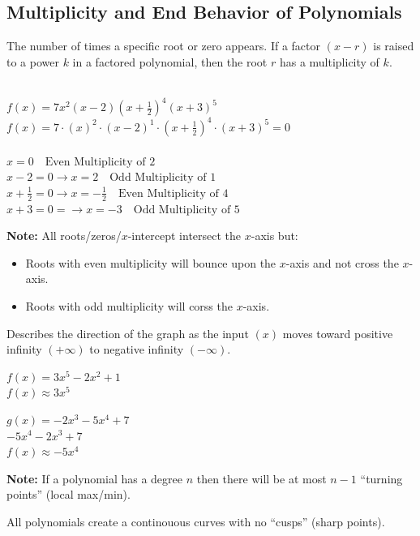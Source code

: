\subsection{Multiplicity and End Behavior of Polynomials}

\begin{definition}[Multiplicity]
  The number of times a specific root or zero appears. If a factor $(x - r)$ is raised to a power $k$ in a factored polynomial, then the root $r$ has a multiplicity of $k$.
\end{definition}

\begin{example}[Multiplicity]
  \hfill \\
  $f(x) = 7x^2 (x - 2) (x + \frac{1}{2})^4 (x + 3)^5$ \\
  $f(x) = 7 \cdot (x)^2 \cdot (x - 2)^1 \cdot (x + \frac{1}{2})^4 \cdot (x + 3)^5 = 0$ \\ \\
  $x = 0 \quad \text{Even Multiplicity of 2}$ \\
  $x - 2 = 0 \to x = 2 \quad \text{Odd Multiplicity of 1}$ \\
  $x + \frac{1}{2} = 0 \to x = -\frac{1}{2} \quad \text{Even Multiplicity of 4}$ \\
  $x + 3 = 0 = \to x = -3 \quad \text{Odd Multiplicity of 5}$
\end{example}

\textbf{Note: }All roots/zeros/$x$-intercept intersect the $x$-axis but:
\begin{itemize}
\item Roots with even multiplicity will bounce upon the $x$-axis and not cross the $x$-axis.
\item Roots with odd multiplicity will corss the $x$-axis.
\end{itemize}

\begin{definition}
  Describes the direction of the graph as the input $(x)$ moves toward positive infinity $(+\infty)$ to negative infinity $(-\infty)$.
\end{definition}

\begin{example}[Multiplicity]
\item $f(x) = 3x^5 - 2x^2 + 1$ \\
  $f(x) \approx 3x^5$
\item $g(x) = -2x^3 - 5x^4 + 7$ \\
  $-5x^4 - 2x^3 + 7$ \\
  $f(x) \approx -5x^4$
\end{example}

\textbf{Note: }If a polynomial has a degree $n$ then there will be at most $n - 1$ ``turning points'' (local max/min).


All polynomials create a continouous curves with no ``cusps'' (sharp points).
